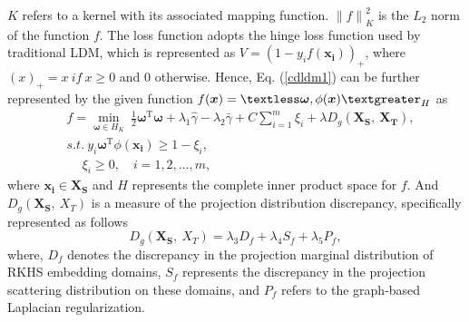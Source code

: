 \documentclass[a4paper]{cas-sc}
\begin{document}
$K$ refers to a kernel with its associated mapping function. 
${\|f\|}_{K}^{2}$ is the $L_2$ norm of the function $f$. The loss function adopts the hinge loss function used by traditional LDM, which is represented as $V = (1-y_if(\boldsymbol{x_i}))_+$, where $(x)_+ = x\ if\ x\geq 0$ and 0 otherwise. Hence, Eq. (\ref{cdldm1}) can be further represented by the given function $f(\boldsymbol{x}) = \textless\boldsymbol{\omega},\phi(\boldsymbol{x})\textgreater_H$ as
\begin{equation}\label{cdldm2}
\begin{aligned}
&f = \min _{\boldsymbol{\omega} \in H_K} \ \frac{1}{2}\boldsymbol{\omega}^{\mathrm{T}}\boldsymbol{\omega} + \lambda_1\widehat \gamma - \lambda_2\bar \gamma + C\sum\limits_{i = 1}^m\xi_i + \lambda D_{g}(\boldsymbol{X_S},\ \boldsymbol{X_T}), \\
& s.t.\ y_{i}\boldsymbol{\omega}^{\mathrm{T}}\phi(\boldsymbol{x_i})\geq 1-\xi_{i},\\
&\ \quad \xi_{i} \geq 0,\quad i=1,2, \ldots, m,
\end{aligned}    
\end{equation}
where $\boldsymbol{x_i} \in \boldsymbol{X_S}$ and $H$ represents the complete inner product space for $f$. And $D_{g}(\boldsymbol{X_S},\ X_T)$ is a measure of the projection distribution discrepancy, specifically represented as follows
\begin{equation}
D_{g}(\boldsymbol{X_S},\ X_T) = \lambda_3 D_f + \lambda_4 S_f + \lambda_5 P_f,
\end{equation}
where, $D_f$ denotes the discrepancy in the projection marginal distribution of RKHS embedding domains, $S_f$ represents the discrepancy in the projection scattering distribution on these domains, and $P_f$ refers to the graph-based Laplacian regularization.

\end{document}
